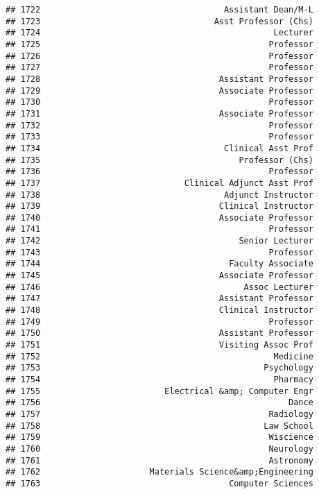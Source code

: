 \documentclass[
]{article}
\begin{document}
\begin{verbatim}
## 1722                                     Assistant Dean/M-L
## 1723                                   Asst Professor (Chs)
## 1724                                               Lecturer
## 1725                                              Professor
## 1726                                              Professor
## 1727                                              Professor
## 1728                                    Assistant Professor
## 1729                                    Associate Professor
## 1730                                              Professor
## 1731                                    Associate Professor
## 1732                                              Professor
## 1733                                              Professor
## 1734                                     Clinical Asst Prof
## 1735                                        Professor (Chs)
## 1736                                              Professor
## 1737                             Clinical Adjunct Asst Prof
## 1738                                     Adjunct Instructor
## 1739                                    Clinical Instructor
## 1740                                    Associate Professor
## 1741                                              Professor
## 1742                                        Senior Lecturer
## 1743                                              Professor
## 1744                                      Faculty Associate
## 1745                                    Associate Professor
## 1746                                         Assoc Lecturer
## 1747                                    Assistant Professor
## 1748                                    Clinical Instructor
## 1749                                              Professor
## 1750                                    Assistant Professor
## 1751                                    Visiting Assoc Prof
## 1752                                               Medicine
## 1753                                             Psychology
## 1754                                               Pharmacy
## 1755                         Electrical &amp; Computer Engr
## 1756                                                  Dance
## 1757                                              Radiology
## 1758                                             Law School
## 1759                                              Wiscience
## 1760                                              Neurology
## 1761                                              Astronomy
## 1762                      Materials Science&amp;Engineering
## 1763                                      Computer Sciences

\end{verbatim}
\end{document}
